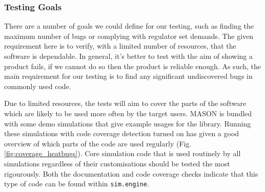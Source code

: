 \documentclass[11pt]{article}
\begin{document}




\subsubsection{Testing Goals}

There are a number of goals we could define for our testing, such as finding the maximum number of bugs or complying with regulator set demands.
The given requirement here is to verify, with a limited number of resources, that the software is dependable.
In general, it's better to test with the aim of showing a product fails, if we cannot do so then the product is reliable enough\cite[pp. 20]{lessons_book}.
As such, the main requirement for our testing is to find any significant undiscovered bugs in commonly used code.


Due to limited resources, the tests will aim to cover the parts of the software which are likely to be used more often by the target users.
MASON is bundled with some demo simulations that give example usages for the library.
Running these simulations with code coverage detection turned on has given a good overview of which parts of the code are used regularly (Fig. \ref{fig:coverage_heatbugs}).
Core simulation code that is used routinely by all simulations regardless of their customisations should be tested the most rigourously.
Both the documentation\cite[pp.85]{mason_doc} and code coverage checks indicate that this type of code can be found within \texttt{sim.engine}.
\end{document}
